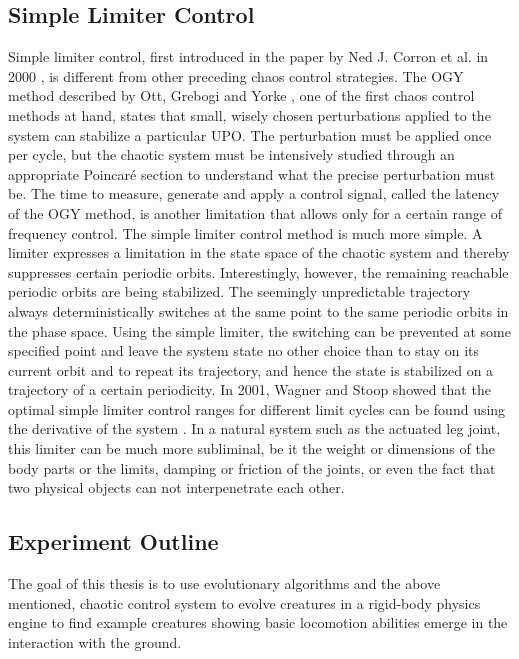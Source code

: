 \documentclass[main]{subfiles}
\begin{document}
\subsection{Simple Limiter Control}

Simple limiter control, first introduced in the paper by Ned J. Corron et al. in 2000 \cite{bib:Corron2000}, is different from other preceding chaos control strategies. %
%
The OGY method described by Ott, Grebogi and Yorke \cite{bib:Ott1990}, one of the first chaos control methods at hand, states that small, wisely chosen perturbations applied to the system can stabilize a particular UPO. %
%
The perturbation must be applied once per cycle, but the chaotic system must be intensively studied through an appropriate Poincaré section to understand what the precise perturbation must be. %
%
The time to measure, generate and apply a control signal, called the latency of the OGY method, is another limitation that allows only for a certain range of frequency control. %
%
The simple limiter control method is much more simple. A limiter expresses a limitation in the state space of the chaotic system and thereby suppresses certain periodic orbits. %
%
%
Interestingly, however, the remaining reachable periodic orbits are being stabilized. %
%
The seemingly unpredictable trajectory always deterministically switches at the same point to the same periodic orbits in the phase space. %
%
Using the simple limiter, the switching can be prevented at some specified point and leave the system state no other choice than to stay on its current orbit and to repeat its trajectory, and hence the state is stabilized on a trajectory of a certain periodicity. %
%
In 2001, Wagner and Stoop showed that the optimal simple limiter control ranges for different limit cycles can be found using the derivative of the system \cite{bib:Wagner2001}. %
%
In a natural system such as the actuated leg joint, this limiter can be much more subliminal, be it the weight or dimensions of the body parts or the limits, damping or friction of the joints, or even the fact that two physical objects can not interpenetrate each other. %
%

\subsection{Experiment Outline}


The goal of this thesis is to use evolutionary algorithms and the above mentioned, chaotic control system to evolve creatures in a rigid-body physics engine to find example creatures showing basic locomotion abilities emerge in the interaction with the ground. %
\end{document}
